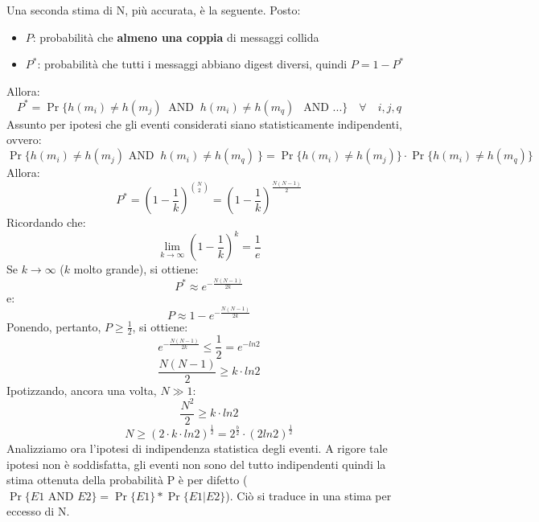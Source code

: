 Una seconda stima di N, più accurata, è la seguente. Posto:
\begin{itemize}
\item $P$: probabilità che \textbf{almeno una coppia} di messaggi collida
\item $P^{*}$: probabilità che tutti i messaggi abbiano digest diversi, quindi $P = 1 - P^{*}$
\end{itemize}
Allora:
\begin{equation}
P^{*} = \Pr\{h(m_i) \neq h(m_j) \: \mbox{ AND } \: h(m_i) \neq h(m_q)\ \: \mbox{ AND } ... \}  \quad \forall \quad i,j,q
\end{equation}
Assunto per ipotesi che gli eventi considerati siano statisticamente indipendenti, ovvero:
\begin{equation}
\Pr\{h(m_i) \neq h(m_j) \mbox{ AND } \: h(m_i) \neq h(m_q)\ \} = \Pr\{h(m_i) \neq h(m_j)\} \cdot \Pr\{h(m_i) \neq h(m_q)\}
\end{equation}
Allora:
\begin{equation}
P^{*} = (1 - \frac{1}{k})^{\binom {N}{2}} = (1 - \frac{1}{k})^{\frac{N(N-1)}{2}}
\end{equation}
Ricordando che:
\begin{equation}
 \lim_{k\to \infty}{(1 - \frac{1}{k})^k} = \frac{1}{e} 
\end{equation}
Se $k\to \infty$ ($k$ molto grande), si ottiene:
\begin{equation}
P^{*} \approx e^{-\frac{N(N-1)}{2k}}
\end{equation}
e:
\begin{equation}
P \approx 1 - e^{-\frac{N(N-1)}{2k}}
\end{equation}
Ponendo, pertanto, $P \geq \frac{1}{2}$, si ottiene:
\begin{equation}
e^{-\frac{N(N-1)}{2k}} \leq \frac{1}{2} = e^{-ln2}
\end{equation}
\begin{equation}
\frac{N(N-1)}{2} \geq k \cdot ln2
\end{equation}
Ipotizzando, ancora una volta, $N \gg 1$:
\begin{equation}
\frac{N^2}{2} \geq k \cdot ln2 
\end{equation}
\begin{equation}
N \geq (2 \cdot k \cdot ln2)^{\frac{1}{2}} = 2^{\frac{b}{2}} \cdot (2ln2)^{\frac{1}{2}}
\end{equation}
Analizziamo ora l'ipotesi di indipendenza statistica degli eventi. A rigore tale ipotesi non è soddisfatta, gli eventi non sono del tutto indipendenti quindi la stima ottenuta della probabilità P è per difetto ($\Pr\{E1 \mbox{ AND } E2\} = \Pr\{E1\} * \Pr\{E1|E2\}$). Ciò si traduce in una stima per eccesso di N. 

